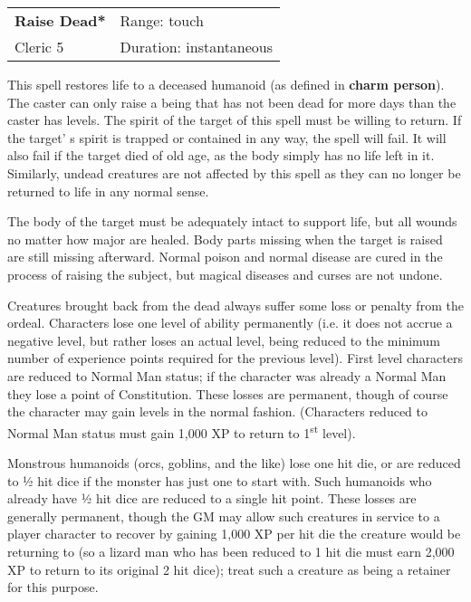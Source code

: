 \documentclass[a4paper,twoside,openany,10pt]{book}
\begin{document}
\begin{multicols}{2}
\smallskip\begin{flushleft} 
	\begin{tabularx}{0.45\textwidth}{@{}m{3.5cm}m{5.5cm}@{}} 
		\textbf{Raise Dead*} & Range: touch\\
		Cleric 5 & Duration: instantaneous\\
	\end{tabularx}\end{flushleft}

This spell restores life to a deceased humanoid (as defined in \textbf{charm person}). The caster can only raise a being that has not been dead for more days than the caster has levels. The spirit of the target of this spell must be willing to return. If the target' s spirit is trapped or contained in any way, the spell will fail. It will also fail if the target died of old age, as the body simply has no life left in it. Similarly, undead creatures are not affected by this spell as they can no longer be returned to life in any normal sense.

The body of the target must be adequately intact to support life, but all wounds no matter how major are healed. Body parts missing when the target is raised are still missing afterward. Normal poison and normal disease are cured in the process of raising the subject, but magical diseases and curses are not undone.

Creatures brought back from the dead always suffer some loss or penalty from the ordeal. Characters lose one level of ability permanently (i.e. it does not accrue a negative level, but rather loses an actual level, being reduced to the minimum number of experience points required for the previous level). First level characters are reduced to Normal Man status; if the character was already a Normal Man they lose a point of Constitution. These losses are permanent, though of course the character may gain levels in the normal fashion. (Characters reduced to Normal Man status must gain 1,000 XP to return to 1\textsuperscript{st} level).

Monstrous humanoids (orcs, goblins, and the like) lose one hit die, or are reduced to ½ hit dice if the monster has just one to start with. Such humanoids who already have ½ hit dice are reduced to a single hit point. These losses are generally permanent, though the GM may allow such creatures in service to a player character to recover by gaining 1,000 XP per hit die the creature would be returning to (so a lizard man who has been reduced to 1 hit die must earn 2,000 XP to return to its original 2 hit dice); treat such a creature as being a retainer for this purpose.


\end{multicols}
\end{document}
